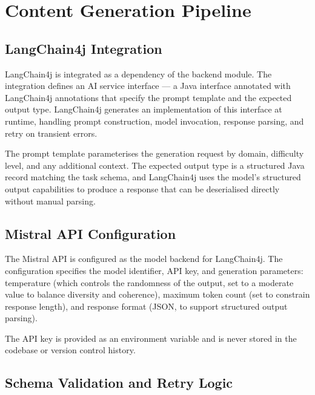 
\section{Content Generation Pipeline}

\subsection{LangChain4j Integration}

LangChain4j is integrated as a dependency of the backend module. The integration defines an AI service interface --- a Java interface annotated with LangChain4j annotations that specify the prompt template and the expected output type. LangChain4j generates an implementation of this interface at runtime, handling prompt construction, model invocation, response parsing, and retry on transient errors.

The prompt template parameterises the generation request by domain, difficulty level, and any additional context. The expected output type is a structured Java record matching the task schema, and LangChain4j uses the model's structured output capabilities to produce a response that can be deserialised directly without manual parsing.


\subsection{Mistral API Configuration}

The Mistral API is configured as the model backend for LangChain4j. The configuration specifies the model identifier, API key, and generation parameters: temperature (which controls the randomness of the output, set to a moderate value to balance diversity and coherence), maximum token count (set to constrain response length), and response format (JSON, to support structured output parsing).

The API key is provided as an environment variable and is never stored in the codebase or version control history.


\subsection{Schema Validation and Retry Logic}

